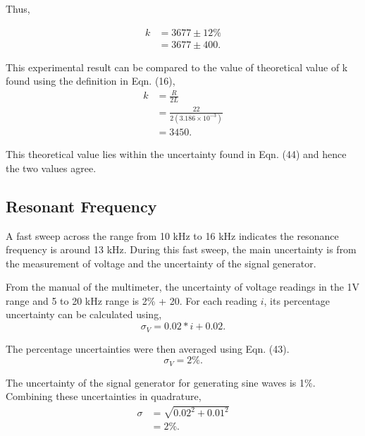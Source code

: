 \documentclass{article}
\begin{document}
Thus,

\begin{equation}
    \begin{split}
        k &= 3677 \pm 12\% \\
        &= 3677 \pm 400.
    \end{split}
\end{equation}

This experimental result can be compared to the value of theoretical value
of k found using the definition in Eqn. (16),
\begin{equation}
    \begin{split}
        k &= \frac{R}{2L} \\
        &= \frac{22}{2(3.186\times 10^{-3})} \\
        &= 3450.
    \end{split}
\end{equation}

This theoretical value lies within the uncertainty found in Eqn. (44) and
hence the two values agree.

\subsection{Resonant Frequency}
A fast sweep across the range from 10 kHz to 16 kHz indicates the resonance
frequency is around 13 kHz. During this fast sweep, the main uncertainty is 
from the measurement of voltage and the uncertainty of the signal generator.

From the manual of the multimeter, the uncertainty of voltage readings in the 
1V range and 5 to 20 kHz range is 2\% + 20. For each reading $i$, its percentage
uncertainty can be calculated using,
\begin{equation}
    \sigma_{V} = 0.02*i + 0.02.
\end{equation}

The percentage uncertainties were then averaged using Eqn. (43).
\begin{equation}
    \sigma_{V} = 2\%.
\end{equation}

The uncertainty of the signal generator for generating sine waves is 1\%.
Combining these uncertainties in quadrature,
\begin{equation}
    \begin{split}
        \sigma &= \sqrt{0.02^2+0.01^2} \\
        &= 2\%.
    \end{split}
\end{equation}
\end{document}

